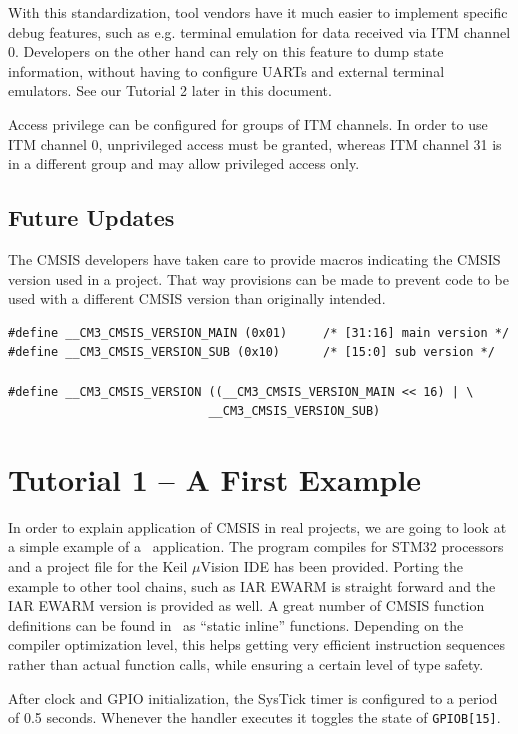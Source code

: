 With this standardization, tool vendors have it much easier to implement
specific debug features, such as e.g. terminal emulation for data received via
ITM channel 0. Developers on the other hand can rely on this feature to dump
state information, without having to configure UARTs and external terminal
emulators. See our Tutorial 2 later in this document.

Access privilege can be configured for groups of ITM channels. In order to use
ITM channel 0, unprivileged access must be granted, whereas ITM channel 31 is in
a different group and may allow privileged access only.

\subsection{Future Updates}

The CMSIS developers have taken care to provide macros indicating the CMSIS
version used in a project. That way provisions can be made to prevent code to be
used with a different CMSIS version than originally intended.

\begin{lstlisting}[style=cpp]
#define __CM3_CMSIS_VERSION_MAIN (0x01)		/* [31:16] main version */
#define __CM3_CMSIS_VERSION_SUB (0x10)		/* [15:0] sub version */

#define __CM3_CMSIS_VERSION ((__CM3_CMSIS_VERSION_MAIN << 16) | \
							__CM3_CMSIS_VERSION_SUB)
\end{lstlisting}

\section{Tutorial 1 – A First Example}

In order to explain application of CMSIS in real projects, we are going to look
at a simple example of a \cm{3}\ application. The program compiles for STM32
processors and a project file for the Keil $\mu$Vision IDE has been provided.
Porting the example to other tool chains, such as IAR EWARM is straight forward
and the IAR EWARM version is provided as well. A great number of CMSIS function
definitions can be found in \file{core\_cm3.h}\ as “static inline” functions.
Depending on the compiler optimization level, this helps getting very efficient
instruction sequences rather than actual function calls, while ensuring a
certain level of type safety.

After clock and GPIO initialization, the SysTick timer is configured to a period
of 0.5 seconds. Whenever the handler executes it toggles the state of
\verb|GPIOB[15]|.

